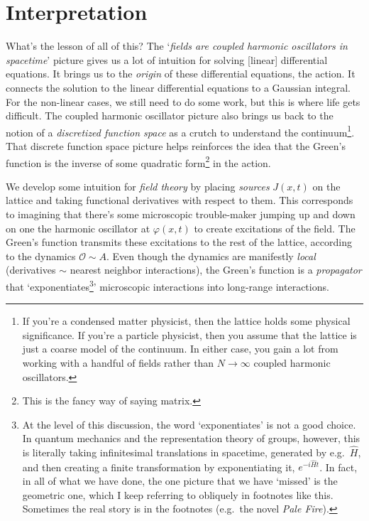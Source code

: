 \section{Interpretation}

What's the lesson of all of this? The `\emph{fields are coupled harmonic oscillators in spacetime}' picture gives us a lot of intuition for solving [linear] differential equations. It brings us to the \emph{origin} of these differential equations, the action. It connects the solution to the linear differential equations to a Gaussian integral. For the non-linear cases, we still need to do some work, but this is where life gets difficult. The coupled harmonic oscillator picture also brings us back to the notion of a \emph{discretized function space} as a crutch to understand the continuum\footnote{If you're a condensed matter physicist, then the lattice holds some physical significance. If you're a particle physicist, then you assume that the lattice is just a coarse model of the continuum. In either case, you gain a lot from working with a handful of fields rather than $N\to \infty$ coupled harmonic oscillators.}. That discrete function space picture helps reinforces the idea that the Green's function is the inverse of some quadratic form\footnote{This is the fancy way of saying matrix.} in the action. 

We develop some intuition for \emph{field theory} by placing \emph{sources} $J(x,t)$ on the lattice and taking functional derivatives with respect to them. This corresponds to imagining that there's some microscopic trouble-maker jumping up and down on one the harmonic oscillator at $\varphi(x,t)$ to create excitations of the field. The Green's function transmits these excitations to the rest of the lattice, according to the dynamics $\mathcal O \sim A$. Even though the dynamics are manifestly \emph{local} (derivatives $\sim$ nearest neighbor interactions), the Green's function is a \emph{propagator} that `exponentiates\footnote{At the level of this discussion, the word `exponentiates' is not a good choice. In quantum mechanics and the representation theory of groups, however, this is literally taking infinitesimal translations in spacetime, generated by e.g.~$\hat H$, and then creating a finite transformation by exponentiating it, $e^{-i\hat H t}$. In fact, in all of what we have done, the one picture that we have `missed' is the geometric one, which I keep referring to obliquely in footnotes like this. Sometimes the real story is in the footnotes (e.g.~the novel \emph{Pale Fire}).}' microscopic interactions into long-range interactions.

